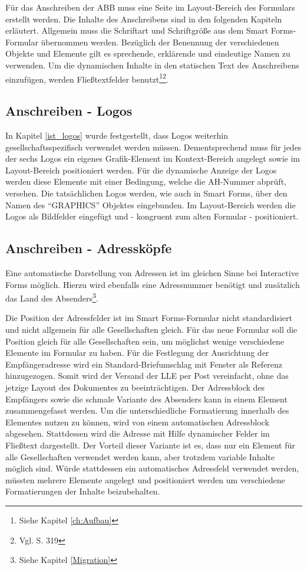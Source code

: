 Für das Anschreiben der ABB muss eine Seite im Layout-Bereich des Formulars erstellt werden. Die Inhalte des Anschreibens sind in den folgenden Kapiteln erläutert. Allgemein muss die Schriftart und Schriftgröße aus dem Smart Forms-Formular übernommen werden. Bezüglich der Benennung der verschiedenen Objekte und Elemente gilt es sprechende, erklärende und eindeutige Namen zu verwenden. Um die dynamischen Inhalte in den statischen Text des Anschreibens einzufügen, werden Fließtextfelder benutzt\footnote{Siehe Kapitel \ref{ch:Aufbau}}\footnote{Vgl. \cite{Hauser.2015} S. 319}.

\subsection{Anschreiben - Logos}

In Kapitel \ref{ist_logos} wurde festgestellt, dass Logos weiterhin gesellschaftsspezifisch verwendet werden müssen. Dementsprechend muss für jedes der sechs Logos ein eigenes Grafik-Element im Kontext-Bereich angelegt sowie im Layout-Bereich positioniert werden. Für die dynamische Anzeige der Logos werden diese Elemente mit einer Bedingung, welche die \ac{AH}-Nummer abprüft, versehen. Die tatsächlichen Logos werden, wie auch in Smart Forms, über den Namen des "`GRAPHICS"' Objektes eingebunden. Im Layout-Bereich werden die Logos als Bildfelder eingefügt und - kongruent zum alten Formular - positioniert. 

\subsection{Anschreiben - Adressköpfe}

Eine automatische Darstellung von Adressen ist im gleichen Sinne bei Interactive Forms möglich. Hierzu wird ebenfalls eine Adressnummer benötigt und zusätzlich das Land des Absenders\footnote{Siehe Kapitel \ref{Migration}}.

Die Position der Adressfelder ist im Smart Forms-Formular nicht standardisiert und nicht allgemein für alle Gesellschaften gleich. Für das neue Formular soll die Position gleich für alle Gesellschaften sein, um möglichst wenige verschiedene Elemente im Formular zu haben. Für die Festlegung der Ausrichtung der Empfängeradresse wird ein Standard-Briefumschlag mit Fenster als Referenz hinzugezogen. Somit wird der Versand der \ac{LLE} per Post vereinfacht, ohne das jetzige Layout des Dokumentes zu beeinträchtigen. Der Adressblock des Empfängers sowie die schmale Variante des Absenders kann in einem Element zusammengefasst werden. Um die unterschiedliche Formatierung innerhalb des Elementes nutzen zu können, wird von einem automatischen Adressblock abgesehen. Stattdessen wird die Adresse mit Hilfe dynamischer Felder im Fließtext dargestellt. Der Vorteil dieser Variante ist es, dass nur ein Element für alle Gesellschaften verwendet werden kann, aber trotzdem variable Inhalte möglich sind.
 Würde stattdessen ein automatisches Adressfeld verwendet werden, müssten mehrere Elemente angelegt und positioniert werden um verschiedene Formatierungen der Inhalte beizubehalten.
 
